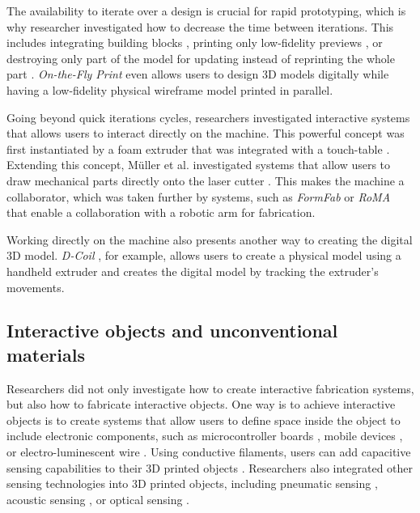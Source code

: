 The availability to iterate over a design is crucial for rapid prototyping, which is why researcher investigated how to decrease the time between iterations. This includes integrating building blocks \cite{Mueller2014}, printing only low-fidelity previews \cite{Mueller2014a}, or destroying only part of the model for updating instead of reprinting the whole part \cite{Teibrich2015}. \textit{On-the-Fly Print} \cite{Peng2016} even allows users to design 3D models digitally while having a low-fidelity physical wireframe model printed in parallel. 


Going beyond quick iterations cycles, researchers investigated interactive systems that allows users to interact directly on the machine. This powerful concept was first instantiated by a foam extruder that was integrated with a touch-table \cite{Willis2011a}. Extending this concept, Müller et al. investigated systems that allow users to draw mechanical parts directly onto the laser cutter \cite{Mueller2012a, Mueller2013}. This makes the machine a collaborator, which was taken further by systems, such as \textit{FormFab} \cite{Baudisch2017} or \textit{RoMA} \cite{Peng2018} that enable a collaboration with a robotic arm for fabrication.

Working directly on the machine also presents another way to creating the digital 3D model. \textit{D-Coil} \cite{Peng2015a}, for example, allows users to create a physical model using a handheld extruder and creates the digital model by tracking the extruder's movements. 



\subsection{Interactive objects and unconventional materials}

Researchers did not only investigate how to create interactive fabrication systems, but also how to fabricate interactive objects. One way is to achieve interactive objects is to create systems that allow users to define space inside the object to include electronic components, such as microcontroller boards \cite{Weichel2013}, mobile devices \cite{Ledo2017}, or electro-luminescent wire \cite{Savage2014}. Using conductive filaments, users can add capacitive sensing capabilities to their 3D printed objects \cite{Schmitz2017, Burstyn2015, Vasilevitsky2016, Katsumoto2013}. Researchers also integrated other sensing technologies into 3D printed objects, including pneumatic sensing \cite{Savage2014, Slyper2012, He2017}, acoustic sensing \cite{Savage2015}, or optical sensing \cite{Willis2012, Savage2013}.

